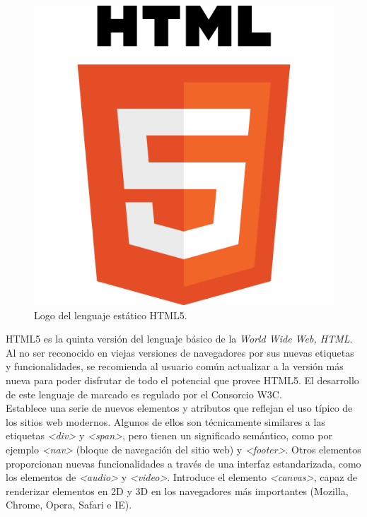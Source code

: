 \begin{figure}[htbp]
	
	\centering
	\includegraphics[scale=0.2]{./Figuras/html5logo.png}
	\caption{Logo del lenguaje est\'atico HTML5. }
	\label{fig:html5}    
	
\end{figure}

HTML5 es la quinta versi\'on del lenguaje b\'asico de la \textit {World Wide Web, HTML}. Al no ser reconocido en viejas versiones de navegadores por sus nuevas etiquetas y funcionalidades, se recomienda al usuario com\'un actualizar a la versi\'on m\'as nueva para poder disfrutar de todo el potencial que provee HTML5. El desarrollo de este lenguaje de marcado es regulado por el Consorcio W3C.\\

Establece una serie de nuevos elementos y atributos que reflejan el uso t\'ipico de los sitios web modernos. Algunos de ellos son t\'ecnicamente similares a las etiquetas \textit{<div>} y \textit{<span>}, pero tienen un significado sem\'antico, como por ejemplo \textit{<nav>} (bloque de navegaci\'on del sitio web) y \textit{<footer>}. Otros elementos proporcionan nuevas funcionalidades a trav\'es de una interfaz estandarizada, como los elementos de \textit{<audio>} y \textit{<video>}. Introduce el elemento \textit{<canvas>}, capaz de renderizar elementos en 2D y 3D en los navegadores m\'as importantes (Mozilla, Chrome, Opera, Safari e IE).\\

